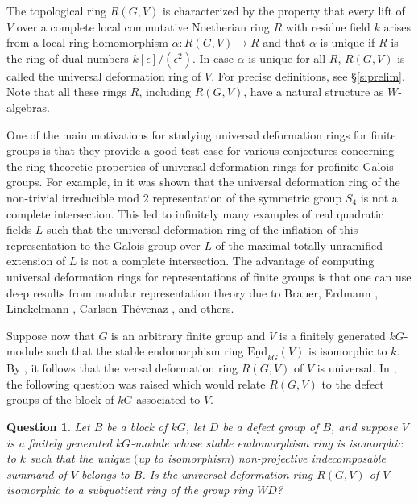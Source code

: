 \documentclass{amsart}
\theoremstyle{plain}
\newtheorem{question}[thm]{Question}
\theoremstyle{definition}
\theoremstyle{remark}
\begin{document}
The topological ring $R(G,V)$ is characterized by the property that every lift of $V$ over
a complete local commutative Noetherian ring $R$ with residue field $k$ arises
from a local ring homomorphism $\alpha: R(G,V)\to R$ and that $\alpha$ is unique
if $R$ is the ring of dual numbers $k[\epsilon]/(\epsilon^2)$. In case $\alpha$ is unique
for all $R$, $R(G,V)$ is called the universal deformation ring of $V$.
For precise definitions, see \S\ref{s:prelim}. 
Note that all these rings $R$, including $R(G,V)$, have a natural structure as $W$-algebras.

One of the main motivations for studying universal deformation rings for finite groups is that they
provide a good test case for various conjectures concerning the ring theoretic properties
of universal deformation rings for profinite Galois groups. 
For example, in \cite{bc4.9,bc5} it was shown that the universal deformation ring of the non-trivial
irreducible mod $2$ representation of the symmetric group $S_4$ is not a complete intersection.
This led to infinitely many examples of real quadratic fields $L$ such that the universal deformation 
ring of the inflation of this representation to the  Galois group over $L$ of the 
maximal totally unramified extension of $L$ is not a complete intersection.
The advantage of computing universal deformation rings for representations of finite groups
is that one can use deep results from modular representation theory due to Brauer, 
Erdmann \cite{erd}, Linckelmann \cite{linckel,linckel1}, Carlson-Th\'{e}venaz \cite{carl2,carl1.5}, and 
others. 

Suppose now that $G$ is an arbitrary finite group and $V$ is a 
finitely generated $kG$-module such that the stable 
endomorphism ring $\underline{\mathrm{End}}_{kG}(V)$ is isomorphic to $k$. 
By \cite[Prop. 2.1]{bc}, it follows that 
the versal deformation ring $R(G,V)$ of $V$ is universal. In \cite{bc}, the following question was
raised which would relate $R(G,V)$ to the defect groups
of the block of $kG$ associated to $V$.

\begin{question}
\label{qu:main} 
Let $B$ be a block of $kG$, let $D$ be a defect group of $B$, and suppose $V$ is a finitely generated 
$kG$-module whose stable endomorphism ring is isomorphic to $k$ 
such that the unique $($up to isomorphism$)$ non-projective indecomposable summand of $V$ 
belongs to $B$. Is the universal deformation ring $R(G,V)$ of $V$ isomorphic to a subquotient ring 
of the group ring $WD$?
\end{question}
\end{document}
